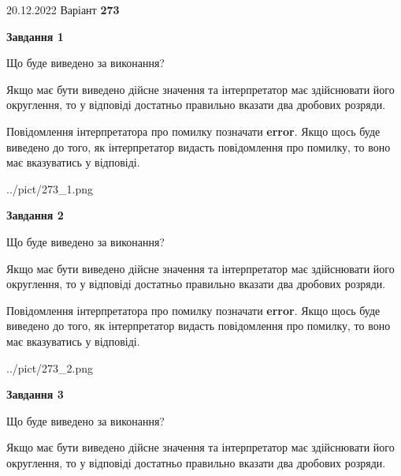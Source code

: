 \documentclass[12pt, ukrainian]{article}
\begin{document}
{20.12.2022 Варіант \No \textbf { 273 }\par}
{
\begin {Large}

{\begin {center}\textbf{Завдання 1}\end {center}}\par
Що буде виведено за виконання? \par

Якщо має бути виведено дійсне значення та інтерпретатор має здійснювати його округлення, 
то у відповіді достатньо правильно вказати два дробових розряди.

Повідомлення інтерпретатора про помилку позначати \textbf{error}.
Якщо щось буде виведено до того, як інтерпретатор видасть повідомлення про помилку, 
то воно має вказуватись у відповіді. \par

\begin{center}
	{../pict/273_1.png}
\end{center}
\newpage

{\begin {center}\textbf{Завдання 2}\end {center}}\par
Що буде виведено за виконання? \par

Якщо має бути виведено дійсне значення та інтерпретатор має здійснювати його округлення, 
то у відповіді достатньо правильно вказати два дробових розряди.

Повідомлення інтерпретатора про помилку позначати \textbf{error}.
Якщо щось буде виведено до того, як інтерпретатор видасть повідомлення про помилку, 
то воно має вказуватись у відповіді. \par

\begin{center}
	{../pict/273_2.png}
\end{center}
\newpage

{\begin {center}\textbf{Завдання 3}\end {center}}\par
Що буде виведено за виконання? \par

Якщо має бути виведено дійсне значення та інтерпретатор має здійснювати його округлення, 
то у відповіді достатньо правильно вказати два дробових розряди.


\end{Large}}
\end{document}
